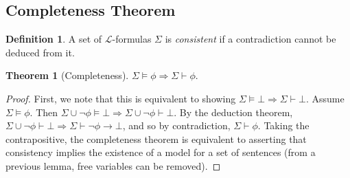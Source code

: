 \documentclass{article}
\theoremstyle{definition}
\newtheorem{thm}{Theorem}[subsubsection]
\newtheorem{defn}{Definition}[subsubsection]
\begin{document}
\subsection{Completeness Theorem}
\begin{defn}
	A set of $\mathcal{L}$-formulas $\Sigma$ is \emph{consistent} if a contradiction cannot be deduced from it.
\end{defn}
\begin{thm}[Completeness]
	$\Sigma\models\phi\Rightarrow\Sigma\vdash\phi$.
\end{thm}
\begin{proof}
	First, we note that this is equivalent to showing $\Sigma\models\bot\Rightarrow\Sigma\vdash\bot$. Assume $\Sigma\models\phi$. Then $\Sigma\cup\neg\phi\models\bot\Rightarrow\Sigma\cup\neg\phi\vdash\bot$. By the deduction theorem, $\Sigma\cup\neg\phi\vdash\bot\Rightarrow\Sigma\vdash\neg\phi\rightarrow\bot$, and so by contradiction, $\Sigma\vdash\phi$. Taking the contrapositive, the completeness theorem is equivalent to asserting that consistency implies the existence of a model for a set of sentences (from a previous lemma, free variables can be removed).\par


\end{proof}
\end{document}
